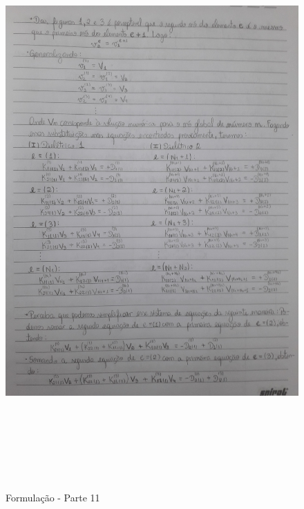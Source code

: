 \documentclass[10pt]{article}
\begin{document}
    \begin{figure}[!htb]
    \centerline{\includegraphics[width=20cm,height=22cm]{Formulação Matemática/Formulacao - Parte 11.jpg}}
    \caption{Formulação - Parte 11}
    \label{fig:fp11}
    \end{figure}
    
\end{document}
